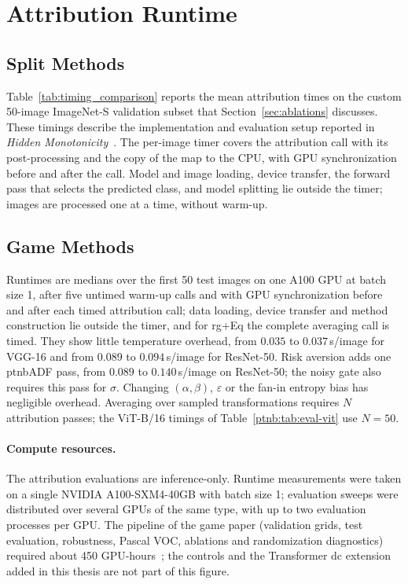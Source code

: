 \section{Attribution Runtime}\label{app:attribution_runtime}

\subsection{Split Methods}\label{app:p1_timing}

Table~\ref{tab:timing_comparison} reports the mean attribution times on the custom 50-image ImageNet-S validation subset that Section~\ref{sec:ablations} discusses. These timings describe the implementation and evaluation setup reported in \emph{Hidden Monotonicity}~\parencite{hiddenMono}. The per-image timer covers the attribution call with its post-processing and the copy of the map to the CPU, with GPU synchronization before and after the call. Model and image loading, device transfer, the forward pass that selects the predicted class, and model splitting lie outside the timer; images are processed one at a time, without warm-up.



\subsection{Game Methods}\label{app:game_timing}

Runtimes are medians over the first 50 test images on one A100 GPU at batch size 1, after five untimed warm-up calls and with GPU synchronization before and after each timed attribution call; data loading, device transfer and method construction lie outside the timer, and for \ac{rg}+Eq the complete averaging call is timed. They show little temperature overhead, from $0.035$ to $0.037$\,s/image for VGG-16 and from $0.089$ to $0.094$\,s/image for ResNet-50. Risk aversion adds one \ac{ptnbADF} pass, from $0.089$ to $0.140$\,s/image on ResNet-50; the noisy gate also requires this pass for $\sigma$. Changing $(\alpha,\beta)$, $\varepsilon$ or the fan-in entropy bias has negligible overhead. Averaging over sampled transformations requires $N$ attribution passes; the ViT-B/16 timings of Table~\ref{ptnb:tab:eval-vit} use $N=50$.

\paragraph{Compute resources.}\label{ptnb:app:compute-resources}
The attribution evaluations are inference-only. Runtime measurements were taken on a single NVIDIA A100-SXM4-40GB with batch size 1; evaluation sweeps were distributed over several GPUs of the same type, with up to two evaluation processes per GPU. The pipeline of the game paper (validation grids, test evaluation, robustness, Pascal VOC, ablations and randomization diagnostics) required about 450 GPU-hours~\parencite{playingBackward2026}; the controls and the Transformer \acs{dc} extension added in this thesis are not part of this figure.

